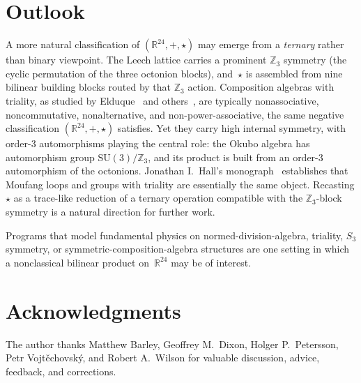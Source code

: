 \documentclass[twoside,english]{paper}
\numberwithin{equation}{section}
\numberwithin{figure}{section}
\theoremstyle{definition}
\theoremstyle{remark}
\newcommand{\RR}{\mathbb{R}}
\newcommand{\ZZ}{\mathbb{Z}}
\begin{document}
\section{Outlook}\label{sec:outlook}

A more natural classification of $(\RR^{24}, +, \star)$ may emerge
from a \emph{ternary} rather than binary viewpoint.  The Leech lattice
carries a prominent $\ZZ_3$ symmetry (the cyclic permutation of the
three octonion blocks), and~$\star$ is assembled from nine bilinear
building blocks routed by that $\ZZ_3$ action.  Composition algebras
with triality, as studied by
Elduque~\cite{Elduque1996,Elduque2000_Triality,Elduque2023_IsotropicNorm}
and others~\cite{SmithVojtechovsky2022,KamiyaOkubo2015,Okubo1995_Book},
are typically nonassociative, noncommutative, nonalternative, and
non-power-associative, the same negative classification $(\RR^{24},
+, \star)$ satisfies.  Yet they carry high internal symmetry, with
order-3 automorphisms playing the central role: the Okubo algebra has
automorphism group $\mathrm{SU}(3)/\ZZ_3$, and its product is built from an
order-3 automorphism of the octonions.  Jonathan I.~Hall's
monograph~\cite{Hall2019_Moufang} establishes that Moufang loops and
groups with triality are essentially the same object.  Recasting
$\star$ as a trace-like reduction of a ternary operation compatible
with the $\ZZ_3$-block symmetry is a natural direction for further
work.

Programs that model fundamental physics on normed-division-algebra,
triality, $S_3$ symmetry, or symmetric-composition-algebra structures
\cite{GresnigtGourlayVarma2023, Koeplinger2023,
FureyHughes2025_TrioOfTrialities, MarraniCorradettiZucconi2025}
are one setting in which a nonclassical bilinear product on~$\RR^{24}$
may be of interest.

\section*{Acknowledgments}

The author thanks Matthew Barley, Geoffrey M.~Dixon, Holger
P.~Petersson, Petr Vojt\v{e}chovsk\'{y}, and Robert A.~Wilson for
valuable discussion, advice, feedback, and corrections.

\end{document}
